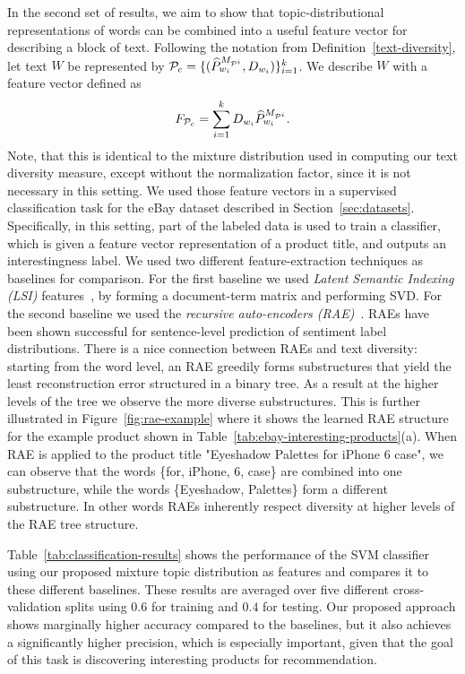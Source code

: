 In the second set of results, we aim to show that topic-distributional
representations of words can be combined into a useful feature vector
for describing a block of text. Following the notation from
Definition~\ref{text-diversity}, let text $W$ be represented by 
${\mathcal P}_c=\{(\widehat{P}^{M_{{\mathcal P}^i}}_{w_i},D_{w_i})\}_{i=1}^k$. We
describe $W$ with a feature vector defined as
\[F_{{\mathcal P}_c}=\sum_{i=1}^k D_{w_i}\widehat{P}^{M_{{\mathcal P}^i}}_{w_i}.\] Note, that this is identical to
the mixture distribution used in computing our text diversity measure, except
without the normalization factor, since it is not necessary in this setting.
We used those feature vectors in a supervised classification
task for the eBay dataset described in
Section~\ref{sec:datasets}. Specifically, in this setting, part of the labeled data
is used to train a classifier, which is given a feature vector
representation of a product title, and outputs an interestingness
label. We used two 
different feature-extraction techniques as baselines for
comparison. For the first baseline we used {\em Latent Semantic
  Indexing (LSI)} features~\cite{Deerwester90indexingby}, by forming a 
document-term matrix and performing SVD. For the second baseline we used the {\em recursive auto-encoders (RAE)}~\cite{Socher:2011:SRA:2145432.2145450}. RAEs 
have been shown successful for sentence-level prediction of sentiment label
distributions. There is a nice connection between RAEs and text diversity: starting from the word level, an RAE greedily forms substructures that yield the least reconstruction error  structured in a  binary tree. As a result at the higher levels of the tree we observe the more diverse  substructures. This is further illustrated in Figure~\ref{fig:rae-example} where it shows the learned RAE structure for the example product shown in Table~\ref{tab:ebay-interesting-products}(a). When RAE is applied to the product title "Eyeshadow Palettes for iPhone 6 case", we can observe that the words \{for, iPhone, 6, case\} are combined into one substructure, while the words \{Eyeshadow, Palettes\} form a different substructure. In other words RAEs inherently respect diversity at higher levels of the RAE tree structure.

Table~\ref{tab:classification-results} shows
the performance of the SVM classifier using our proposed mixture topic
distribution as features and compares it to these different baselines.
These results are averaged over five different cross-validation splits using $0.6$ for training
and $0.4$ for testing. Our proposed approach shows marginally higher
accuracy compared to the baselines, but it also achieves a
significantly higher precision, which is especially important, given
that the goal of this task is discovering interesting products for
recommendation.
